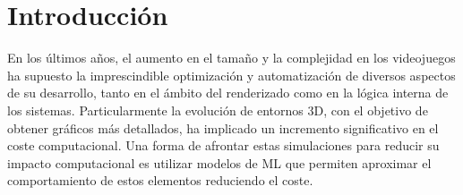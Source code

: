 \chapter{Introducción}
\label{cap:introduccion}

En los últimos años, el aumento en el tamaño y la complejidad en los videojuegos ha supuesto la imprescindible optimización y automatización de diversos aspectos de su desarrollo, tanto en el ámbito del renderizado como en la lógica interna de los sistemas. Particularmente la evolución de entornos 3D, con el objetivo de obtener gráficos más detallados, ha implicado un incremento significativo en el coste computacional. Una forma de afrontar estas simulaciones para reducir su impacto computacional es utilizar modelos de ML que permiten aproximar el comportamiento de estos elementos reduciendo el coste.\newline


